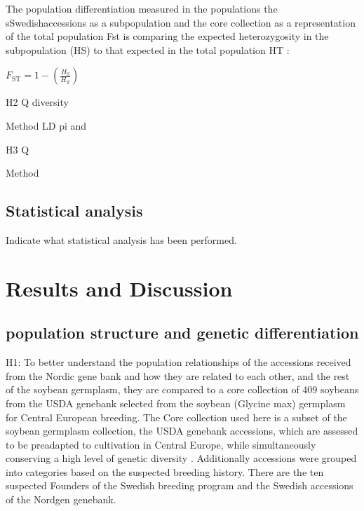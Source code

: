 \documentclass[9pt, onecolumn,twoside]{gsajnl}
\begin{document}
The population differentiation measured in the populations the sSwedishaccessions as a subpopulation and the core collection as a representation of the total population
Fst is comparing the expected heterozygosity in the subpopulation (HS) to that expected in the total population HT :

$F_{\text{ST}} = 1 - \left(\frac{H_{\text{S}}}{H_{\text{T}}}\right)$


H2 
Q diversity 

Method
LD
pi and 

H3
Q 

Method


\subsection{Statistical analysis}

Indicate what statistical analysis has been performed.


\section{Results and Discussion}
\subsection{population structure and genetic differentiation} 

H1: 
To better understand the population relationships of the accessions received from the Nordic gene bank and how they are related to each other, and the rest of the soybean germplasm, they are compared to a core collection of 409 soybeans from the USDA genebank selected from the soybean (Glycine max) germplasm for Central European breeding.  The Core collection used here is a subset of the soybean germplasm collection, the  USDA genebank accessions, which are assessed to be  preadapted to cultivation in Central Europe, while simultaneously conserving a high level of genetic diversity \cite{haupt20}. Additionally accessions were grouped into categories based on the suspected breeding history.  There are the ten suspected Founders of the Swedish breeding program and the Swedish accessions of the Nordgen genebank. 
\end{document}
